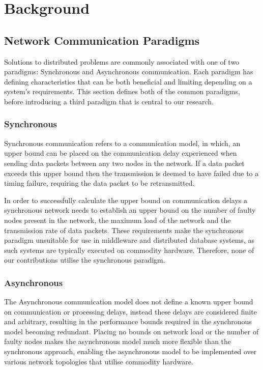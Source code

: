  \chapter{Background}

    \graphicspath{{Chapter2-Background/Figs/Vector/}{Chapter2-Background/Figs/}}

\section[Network Communication Paradigms]{Network Communication Paradigms}
Solutions to distributed problems are commonly associated with one of two paradigms: Synchronous and Asynchronous communication. Each paradigm has defining characteristics that can be both beneficial and limiting depending on a system's requirements.  This section defines both of the common paradigms, before introducing a third paradigm that is central to our research.  

	\subsection{Synchronous}
	Synchronous communication refers to a communication model, in which, an upper bound can be placed on the communication delay experienced when sending data packets between any two nodes in the network. If a data packet exceeds this upper bound then the transmission is deemed to have failed due to a timing failure, requiring the data packet to be retransmitted. 
	
	In order to successfully calculate the upper bound on communication delays a synchronous network needs to establish an upper bound on the number of faulty nodes present in the network, the maximum load of the network and the transmission rate of data packets\citep{Cristian:1996:SA:227210.227231}. These requirements make the synchronous paradigm unsuitable for use in middleware and distributed database systems, as such systems are typically executed on commodity hardware.  Therefore, none of our contributions utilise the synchronous paradigm.  
	 
	\subsection{Asynchronous}
	The Asynchronous communication model does not define a known upper bound on communication or processing delays, instead these delays are considered finite and arbitrary, resulting in the performance bounds required in the synchronous model becoming redundant\citep{Cristian:1996:SA:227210.227231}. Placing no bounds on network load or the number of faulty nodes makes the asynchronous model much more flexible than the synchronous approach, enabling the asynchronous model to be implemented over various network topologies that utilise commodity hardware. 

